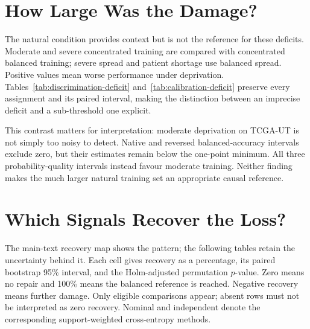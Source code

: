 \clearpage
\section{How Large Was the Damage?}
\label{app:damage-estimates}
The natural condition provides context but is not the reference for these deficits. Moderate and severe concentrated training are compared with concentrated balanced training; severe spread and patient shortage use balanced spread. Positive values mean worse performance under deprivation. Tables~\ref{tab:discrimination-deficit} and~\ref{tab:calibration-deficit} preserve every assignment and its paired interval, making the distinction between an imprecise deficit and a sub-threshold one explicit.

\begin{table}[H]
\centering\small\setlength{\tabcolsep}{4pt}

\caption{Balanced-accuracy loss in percentage points, with paired 95\% intervals. Eligibility requires both the dataset's minimum deficit and an interval excluding zero. TCGA-UT moderate has small positive estimates, not an established absence of loss.}
\label{tab:discrimination-deficit}
\end{table}

\begin{table}[H]
\centering\small\setlength{\tabcolsep}{4pt}

\caption{Tail-group negative-log-likelihood increase in nats, with paired 95\% intervals. Negative values mean improved probability quality. TCGA-UT moderate improves this endpoint under all three assignments, even though balanced accuracy falls slightly.}
\label{tab:calibration-deficit}
\end{table}

\noindent This contrast matters for interpretation: moderate deprivation on TCGA-UT is not simply too noisy to detect. Native and reversed balanced-accuracy intervals exclude zero, but their estimates remain below the one-point minimum. All three probability-quality intervals instead favour moderate training. Neither finding makes the much larger natural training set an appropriate causal reference.

\clearpage
\section{Which Signals Recover the Loss?}
\label{app:recovery-estimates}
The main-text recovery map shows the pattern; the following tables retain the uncertainty behind it. Each cell gives recovery as a percentage, its paired bootstrap 95\% interval, and the Holm-adjusted permutation $p$-value. Zero means no repair and 100\% means the balanced reference is reached. Negative recovery means further damage. Only eligible comparisons appear; absent rows must not be interpreted as zero recovery. Nominal and independent denote the corresponding support-weighted cross-entropy methods.

